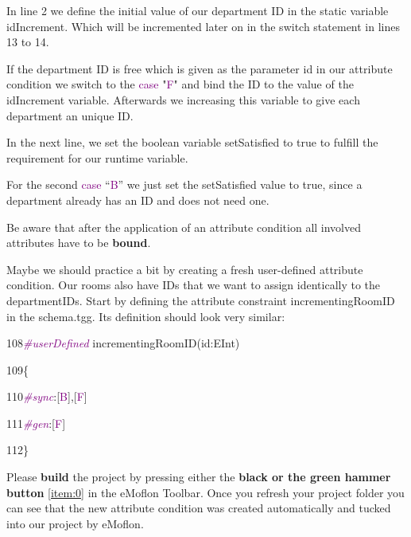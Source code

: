 \clearpage

In line 2 we define the initial value of our department ID in the static variable \textsf{idIncrement}. Which will be incremented later on in the switch statement in lines 13 to 14.

If the department ID is free which is given as the parameter \textsf{id} in our attribute condition we switch to the \textcolor{Purple}{case} \textsf{"\textcolor{Purple}{F}"} and bind the ID to the value of the \textsf{idIncrement} variable. Afterwards we increasing this variable to give each department an unique ID.

In the next line, we set the boolean variable \textsf{setSatisfied} to \textsf{true} to fulfill the requirement for our runtime variable.

For the second \textcolor{Purple}{case} \textsf{“\textcolor{Purple}{B}”} we just set the setSatisfied value to true, since a department already has an ID and does not need one. \newline

Be aware that after the application of an attribute condition all involved attributes have to be \textbf{bound}.\newline

Maybe we should practice a bit by creating a fresh user-defined attribute condition. Our rooms also have IDs that we want to assign identically to the departmentIDs. Start by defining the attribute constraint \textsf{incrementingRoomID} in the \textsf{schema.tgg}. Its definition should look very similar:\newline

{

108\hspace{0.5cm}\textcolor{Purple}{\textit{\#userDefined}} incrementingRoomID(id:EInt)

109\hspace{0.5cm}\{
	
110\hspace{1cm}\textcolor{Purple}{\textit{\#sync}}:[\textcolor{Purple}{B}],[\textcolor{Purple}{F}]
		
111\hspace{1cm}\textcolor{Purple}{\textit{\#gen}}:[\textcolor{Purple}{F}]
		
112\hspace{0.5cm}\}\newline

}

Please \textbf{build} the project by pressing either the \textbf{black or the green hammer button} \ref{item:0} in the eMoflon Toolbar. Once you refresh your project folder you can see that the new attribute condition was created automatically and tucked into our project by eMoflon.

